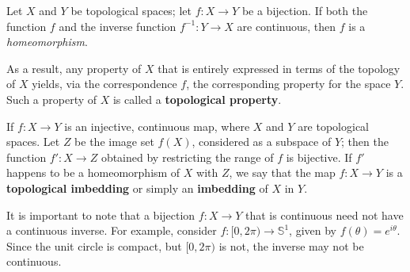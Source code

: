 \begin{definition}[Homeomorphism]
    Let $X$ and $Y$ be topological spaces; let $f:X\to Y$ be a bijection. If both the function $f$ and the inverse function $f^{-1}:Y\to X$ are continuous, then $f$ is a \textit{homeomorphism}.
\end{definition}

As a result, any property of $X$ that is entirely expressed in terms of the topology of $X$ yields, via the correspondence $f$, the corresponding property for the space $Y$. Such a property of $X$ is called a \textbf{topological property}.

If $f:X\to Y$ is an injective, continuous map, where $X$ and $Y$ are topological spaces. Let $Z$ be the image set $f(X)$, considered as a subspace of $Y$; then the function $f':X\to Z$ obtained by restricting the range of $f$ is bijective. If $f'$ happens to be a homeomorphism of $X$ with $Z$, we say that the map $f:X\to Y$ is a \textbf{topological imbedding} or simply an \textbf{imbedding} of $X$ in $Y$.

It is important to note that a bijection $f:X\to Y$ that is continuous need not have a continuous inverse. For example, consider $f:[0,2\pi)\to\mathbb{S}^{1}$, given by $f(\theta) = e^{i\theta}$. Since the unit circle is compact, but $[0,2\pi)$ is not, the inverse may not be continuous.

